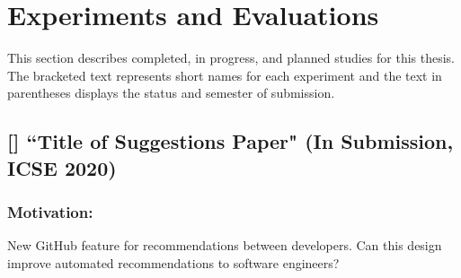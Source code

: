 \section{Experiments and Evaluations}

This section describes completed, in progress, and planned studies for this thesis. The bracketed text represents short names for each experiment and the text in parentheses displays the status and semester of submission.



\subsection{[\sugg] ``Title of Suggestions Paper" (In Submission, ICSE 2020)}

\subsubsection{Motivation:} New GitHub feature for recommendations between developers. Can this design improve automated recommendations to software engineers?

